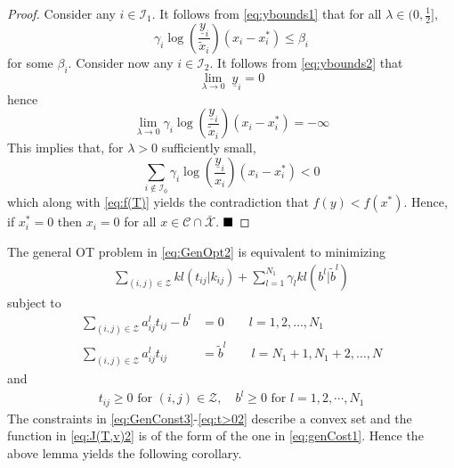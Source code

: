 \documentclass[twocolumn]{article}
\def\qed{ \rule{.1in}{.1in}}
\begin{document}
\begin{proof}
Consider any $i \in {\mathcal I}_1$.
It follows from \eqref{eq:ybounds1} that for all $\lambda \in (0, \frac{1}{2}]$,
 \[
\gamma_i\log \left( \frac{\underline{y}_i}{\tilde{x}_i }\right)(x_i- x^*_i) \le \beta_i
\]
  for some $\beta_i$.
Consider now any $i \in {\mathcal I}_2$.
It follows from \eqref{eq:ybounds2} that
\[
\lim_{\lambda \rightarrow 0} \; \underline{y}_i  = 0
\]
hence
\[
\lim_{\lambda \rightarrow 0} \gamma_i\log \left( \frac{\underline{y}_i}{\tilde{x}_i }\right)(x_i- x^*_i) = -\infty
\]
This implies  that, for $\lambda >0$ sufficiently small,
\[
\sum_{i\notin {\mathcal I}_0} \gamma_i\log \left( \frac{\underline{y}_i}{x_i }\right) (x_i - x^*_i) <0
\]
which along with \eqref{eq:f(T)} yields the contradiction that
$
f(y)  < f(x^*).
$ 
Hence, if  $x^*_i =0$  then $x_i =0$ for all   $x \in {\mathcal C} \cap\bar{\mathcal X}$.
\hfill
$\qed$
\end{proof}


The  general OT problem in \eqref{eq:GenOpt2} is equivalent to minimizing
\begin{align}
\label{eq:J(T,v)2}
\sum_{(i,j)\in \mathcal{Z}}  kl(t_{ij} | k_{ij})  + \sum_{l=1}^{N_1} 
\gamma_l kl(b^l | \tilde{b}^l )
\end{align}
subject to 
\begin{align}
\label{eq:GenConst3}
\sum_{(i,j) \in {\mathcal Z}} a^l_{ij} t_{ij} -b^l&= 0\qquad l=1,2,\dots, N_1\\
\label{eq:GenConst4}
\sum_{(i,j) \in \mathcal Z} a^l_{ij}t_{ij} &= \tilde{b}^l
\qquad l= N_1+1, N_1+2,\dots, N
\end{align}
and
\begin{align}
\label{eq:t>02}
 t_{ij} \ge 0 \mbox{ for } (i,j) \in {\mathcal Z},\quad 
b^l \ge 0  \mbox{ for } l=1,2, \cdots, N_1	
 \end{align}
The constraints in \eqref{eq:GenConst3}-\eqref{eq:t>02} describe a convex set and the 
function  in \eqref{eq:J(T,v)2} is of the form of the one in \eqref{eq:genCost1}. Hence the above lemma yields the following corollary.
\end{document}
